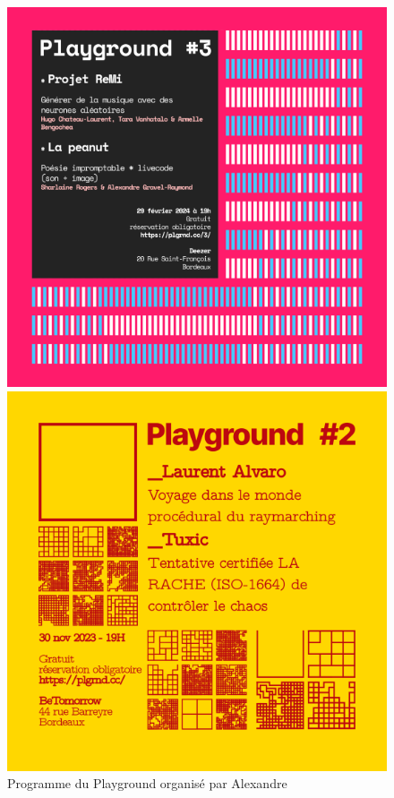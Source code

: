 \begin{figure}[h]
  \begin{minipage}[b]{0.45\linewidth}
    \centering
    \includegraphics[width=.8\linewidth]{images/conclusion/peanut00.png}
  \end{minipage}
  \hspace{0.1\linewidth} %
  \begin{minipage}[b]{0.45\linewidth}
    \centering
    \includegraphics[width=.8\linewidth]{images/conclusion/peanut01.png}
  \end{minipage}
  \caption{Programme du Playground organisé par Alexandre}
  \label{peanut}
\end{figure}


